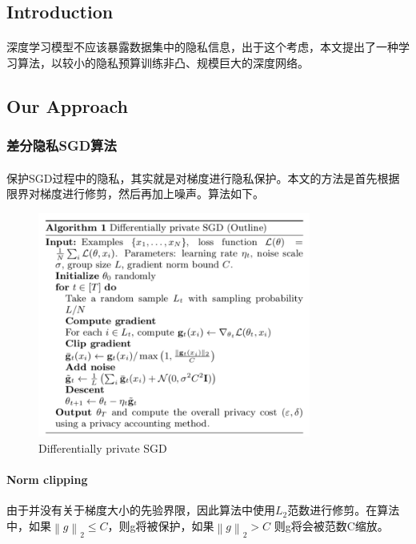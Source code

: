 \documentclass[12pt,a4paper]{article}
\begin{document}
\subsection{Introduction}
\paragraph{} 深度学习模型不应该暴露数据集中的隐私信息，出于这个考虑，本文提出了一种学习算法，以较小的隐私预算训练非凸、规模巨大的深度网络。
\subsection{Our Approach}
\subsubsection{差分隐私SGD算法}
\paragraph{} 保护SGD过程中的隐私，其实就是对梯度进行隐私保护。本文的方法是首先根据限界对梯度进行修剪，然后再加上噪声。算法如下。
\begin{figure}[H]
	\centering
	\includegraphics[width=0.8\textwidth]{../images/dpsgd.png}
	\caption{Differentially private SGD}
	\label{}
\end{figure}

\paragraph{Norm clipping} 由于并没有关于梯度大小的先验界限，因此算法中使用$L_2$范数进行修剪。在算法中，如果$\left \| g \right \|_2 \leq C$，则g将被保护，如果$\left \| g \right \|_2 > C$ 则g将会被范数C缩放。
\end{document}
